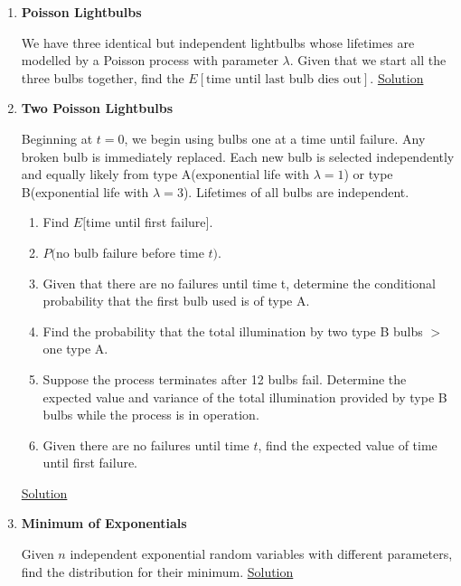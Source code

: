 \documentclass[../probability-notes.tex]{subfiles}
\begin{document}
\begin{enumerate}
    \item \hypertarget{q_poissonbulb}{\textbf{Poisson Lightbulbs}}\newline
    We have three identical but independent lightbulbs whose lifetimes are modelled by a Poisson process with parameter $\lambda$. Given that we start all the three bulbs together, find the $E[\text{time until last bulb dies out}]$. \hyperlink{a_poissonbulb}{Solution}


    \item \hypertarget{q_poissonbulb2}{\textbf{Two Poisson Lightbulbs}}\newline
    Beginning at $t=0$, we begin using bulbs one at a time until failure. Any broken bulb is immediately replaced. Each new bulb is selected independently and equally likely from type A(exponential life with $\lambda = 1$) or type B(exponential life with $\lambda = 3$). Lifetimes of all bulbs are independent.
    \begin{enumerate}
        \item Find $E[$time until first failure$]$.
        \item $P($no bulb failure before time $t)$.
        \item Given that there are no failures until time t, determine the conditional probability that the first bulb used is of type A.
        \item Find the probability that the total illumination by two type B bulbs $>$ one type A.
        \item Suppose the process terminates after 12 bulbs fail. Determine the expected value and variance of the total illumination provided by type B bulbs while the process is in operation.
        \item Given there are no failures until time $t$, find the expected value of time until first failure.
    \end{enumerate}
    \hyperlink{a_poissonbulb2}{Solution}

    \item \hypertarget{q_minexp}{\textbf{Minimum of Exponentials}}\newline
    Given $n$ independent exponential random variables with different parameters, find the distribution for their minimum. \hyperlink{a_minexp}{Solution}


\end{enumerate}
\end{document}
